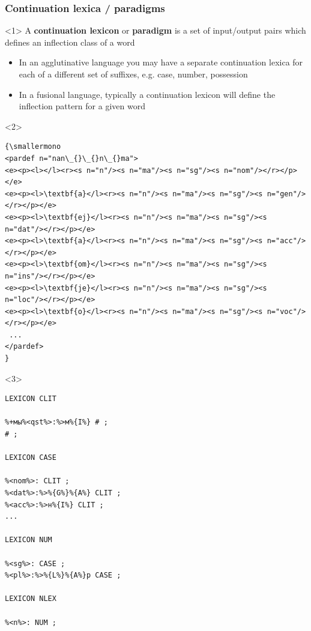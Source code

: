 \documentclass[10pt,xetex]{beamer} %
\begin{document}
\begin{frame}[fragile]
  \frametitle{Continuation lexica / paradigms}

\begin{onlyenv}<1>
 A {\bf continuation lexicon} or {\bf paradigm} is a set of input/output pairs which defines an inflection class of a word

\begin{itemize}
  \item In an agglutinative language you may have a separate continuation lexica for each of a different set of suffixes, e.g. case, number, possession
  \item In a fusional language, typically a continuation lexicon will define the inflection pattern for a given word
\end{itemize}
\end{onlyenv}

\begin{onlyenv}<2>
    \begin{verbatim}
{\smallermono
<pardef n="nan\_{}\_{}n\_{}ma">
<e><p><l></l><r><s n="n"/><s n="ma"/><s n="sg"/><s n="nom"/></r></p></e>
<e><p><l>\textbf{a}</l><r><s n="n"/><s n="ma"/><s n="sg"/><s n="gen"/></r></p></e>
<e><p><l>\textbf{ej}</l><r><s n="n"/><s n="ma"/><s n="sg"/><s n="dat"/></r></p></e>
<e><p><l>\textbf{a}</l><r><s n="n"/><s n="ma"/><s n="sg"/><s n="acc"/></r></p></e>
<e><p><l>\textbf{om}</l><r><s n="n"/><s n="ma"/><s n="sg"/><s n="ins"/></r></p></e>
<e><p><l>\textbf{je}</l><r><s n="n"/><s n="ma"/><s n="sg"/><s n="loc"/></r></p></e>
<e><p><l>\textbf{o}</l><r><s n="n"/><s n="ma"/><s n="sg"/><s n="voc"/></r></p></e>
 ...
</pardef>
}
\end{verbatim}
\end{onlyenv}

\begin{onlyenv}<3>
\vspace{-5pt}
\begin{verbatim}
LEXICON CLIT

%+мы%<qst%>:%>м%{I%} # ;
# ;

LEXICON CASE

%<nom%>: CLIT ;
%<dat%>:%>%{G%}%{A%} CLIT ;
%<acc%>:%>н%{I%} CLIT ;
...

LEXICON NUM

%<sg%>: CASE ;
%<pl%>:%>%{L%}%{A%}р CASE ;

LEXICON NLEX

%<n%>: NUM ;

\end{verbatim}
\end{onlyenv}


\end{frame}
\end{document}
